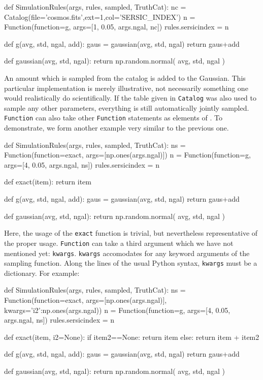 \documentclass[11pt]{book}
\newcommand{\codett}[1]{\lstinline{#1}}
\newcommand{\py}{Python}
\begin{document}
\begin{code}
def SimulationRules(args, rules, sampled, TruthCat):
    nc = Catalog(file='cosmos.fits',ext=1,col='SERSIC_INDEX')
    n = Function(function=g, args=[1, 0.05, args.ngal, nc])
    rules.sersicindex = n

def g(avg, std, ngal, add):
    gaus = gaussian(avg, std, ngal)
    return gaus+add

def gaussian(avg, std, ngal):
    return np.random.normal( avg, std, ngal )
\end{code}

\noindent An amount which is sampled from the catalog is added to the Gaussian.
This particular implementation is merely illustrative, not necessarily
something one would realistically do scientifically.
If the table given in \codett{Catalog} was also used to sample any other parameters,
everything is still automatically jointly sampled.
\codett{Function} can also take other \codett{Function} statements as elements of \simargs{}.
To demonstrate, we form another example very similar to the previous one.

\begin{code}
def SimulationRules(args, rules, sampled, TruthCat):
    ns = Function(function=exact, args=[np.ones(args.ngal)])
    n = Function(function=g, args=[4, 0.05, args.ngal, ns])
    rules.sersicindex = n

def exact(item):
    return item

def g(avg, std, ngal, add):
    gaus = gaussian(avg, std, ngal)
    return gaus+add

def gaussian(avg, std, ngal):
    return np.random.normal( avg, std, ngal )
\end{code}

\noindent Here, the usage of the \codett{exact} function is trivial, but nevertheless
representative of the proper usage.
\codett{Function} can take a third argument which we have not mentioned yet: \codett{kwargs}.
\codett{kwargs} accomodates for any keyword arguments of the sampling function.
Along the lines of the usual \py{} syntax, \codett{kwargs} must be a dictionary.
For example:

\begin{code}
def SimulationRules(args, rules, sampled, TruthCat):
    ns = Function(function=exact, args=[np.ones(args.ngal)], kwargs={'i2':np.ones(args.ngal)})
    n = Function(function=g, args=[4, 0.05, args.ngal, ns])
    rules.sersicindex = n

def exact(item, i2=None):
    if item2==None:
        return item
    else:
        return item + item2

def g(avg, std, ngal, add):
    gaus = gaussian(avg, std, ngal)
    return gaus+add

def gaussian(avg, std, ngal):
    return np.random.normal( avg, std, ngal )
\end{code}
\end{document}
